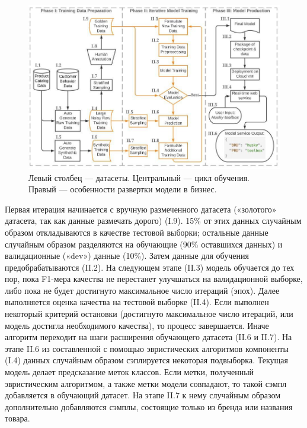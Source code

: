 \documentclass[12pt,a4paper]{article}
\begin{document}
\begin{figure}[H]
\begin{center}
  \includegraphics[width=1.0\textwidth]{loop.jpg}
  \caption{Левый столбец --- датасеты. Центральный --- цикл обучения. Правый --- особенности развертки модели в бизнес.}
\end{center}
\end{figure}

\noindent Первая итерация начинается с вручную размеченного датасета («золотого» датасета, так как данные размечать дорого) (I.9). 15\% от этих данных случайным образом откладываются в качестве тестовой выборки; остальные данные случайным образом разделяются на обучающие (90\% оставшихся данных) и валидационные («dev») данные (10\%). Затем данные для обучения предобрабатываются (II.2). На следующем этапе (II.3) модель обучается до тех пор, пока F1-мера качества не перестанет улучшаться на валидационной выборке, либо пока не будет достигнуто максимальное число итераций (эпох). Далее выполняется оценка качества на тестовой выборке (II.4). Если выполнен некоторый критерий остановки (достигнуто максимальное число итераций, или модель достигла необходимого качества), то процесс завершается. Иначе алгоритм переходит на шаги расширения обучающего датасета (II.6 и II.7). На этапе II.6 из составленной с помощью эвристических алгоритмов компоненты (I.4) данных случайным образом сэплируется некоторая подвыборка. Текущая модель делает предсказание меток классов. Если метки, полученный эвристическим алгоритмом, а также метки модели совпадают, то такой сэмпл добавляется в обучающий датасет. На этапе II.7 к нему случайным образом дополнительно добавляются сэмплы, состоящие только из бренда или названия товара. 
\end{document}
